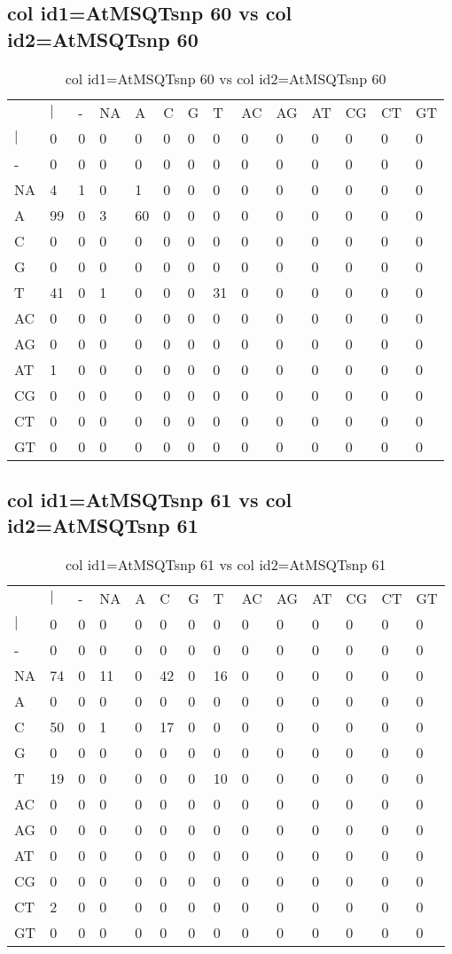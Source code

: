 \subsection{col id1=AtMSQTsnp 60 vs col id2=AtMSQTsnp 60}
\begin{center}
\begin{longtable}{|l|l|l|l|l|l|l|l|l|l|l|l|l|l|}
\caption{col id1=AtMSQTsnp 60 vs col id2=AtMSQTsnp 60} \label{table_dm748}\\
\hline
\\
\hline
&$|$&-&NA&A&C&G&T&AC&AG&AT&CG&CT&GT\\
$|$&0&0&0&0&0&0&0&0&0&0&0&0&0\\
-&0&0&0&0&0&0&0&0&0&0&0&0&0\\
NA&4&1&0&1&0&0&0&0&0&0&0&0&0\\
A&99&0&3&60&0&0&0&0&0&0&0&0&0\\
C&0&0&0&0&0&0&0&0&0&0&0&0&0\\
G&0&0&0&0&0&0&0&0&0&0&0&0&0\\
T&41&0&1&0&0&0&31&0&0&0&0&0&0\\
AC&0&0&0&0&0&0&0&0&0&0&0&0&0\\
AG&0&0&0&0&0&0&0&0&0&0&0&0&0\\
AT&1&0&0&0&0&0&0&0&0&0&0&0&0\\
CG&0&0&0&0&0&0&0&0&0&0&0&0&0\\
CT&0&0&0&0&0&0&0&0&0&0&0&0&0\\
GT&0&0&0&0&0&0&0&0&0&0&0&0&0\\
\hline
\end{longtable}
\end{center}

\subsection{col id1=AtMSQTsnp 61 vs col id2=AtMSQTsnp 61}
\begin{center}
\begin{longtable}{|l|l|l|l|l|l|l|l|l|l|l|l|l|l|}
\caption{col id1=AtMSQTsnp 61 vs col id2=AtMSQTsnp 61} \label{table_dm750}\\
\hline
\\
\hline
&$|$&-&NA&A&C&G&T&AC&AG&AT&CG&CT&GT\\
$|$&0&0&0&0&0&0&0&0&0&0&0&0&0\\
-&0&0&0&0&0&0&0&0&0&0&0&0&0\\
NA&74&0&11&0&42&0&16&0&0&0&0&0&0\\
A&0&0&0&0&0&0&0&0&0&0&0&0&0\\
C&50&0&1&0&17&0&0&0&0&0&0&0&0\\
G&0&0&0&0&0&0&0&0&0&0&0&0&0\\
T&19&0&0&0&0&0&10&0&0&0&0&0&0\\
AC&0&0&0&0&0&0&0&0&0&0&0&0&0\\
AG&0&0&0&0&0&0&0&0&0&0&0&0&0\\
AT&0&0&0&0&0&0&0&0&0&0&0&0&0\\
CG&0&0&0&0&0&0&0&0&0&0&0&0&0\\
CT&2&0&0&0&0&0&0&0&0&0&0&0&0\\
GT&0&0&0&0&0&0&0&0&0&0&0&0&0\\
\hline
\end{longtable}
\end{center}

